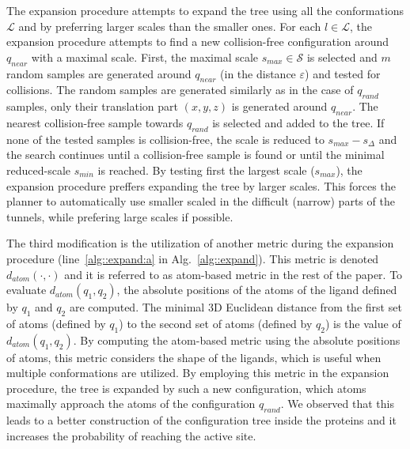\documentclass[usletter, 10pt, conference]{ieeeconf} %
\def\qrand{q_{rand}}
\def\qnear{q_{near}}
\def\da{d_{atom}}
\def\smin{s_{min}}
\def\smax{s_{max}}
\def\sdelta{s_{\Delta}}
\def\L{\mathcal{L}}
\def\S{\mathcal{S}}
\begin{document}
The expansion procedure attempts to expand the tree using all the conformations $\L$ and by preferring larger scales than the smaller ones.
For each $l \in \L$, the expansion procedure attempts to find a new collision-free configuration around $\qnear$ with a maximal scale.
First, the maximal scale $\smax \in \S$ is selected and $m$ random samples are generated around $\qnear$ (in the distance $\varepsilon$) 
and tested for collisions.
The random samples are generated similarly as in the case of $\qrand$ samples, only their translation
part $(x,y,z)$ is generated around $\qnear$.
The nearest collision-free sample towards $\qrand$ is selected and added to the tree.
If none of the tested samples is collision-free, the scale is reduced to $\smax-\sdelta$ and the search continues
until a collision-free sample is found or until the minimal reduced-scale $\smin$ is reached.
By testing first the largest scale ($\smax$), the expansion procedure preffers expanding the tree by larger scales.
This forces the planner to automatically use smaller scaled in the difficult (narrow) parts of the tunnels, while prefering
large scales if possible.

The third modification is the utilization of another metric during the expansion procedure (line~\ref{alg::expand:a} in Alg.~\ref{alg::expand}).
This metric is denoted $\da(\cdot,\cdot)$ and it is referred to as atom-based metric in the rest of the paper.
To evaluate $\da(q_1,q_2)$, the absolute positions of the atoms of the ligand defined by $q_1$ and $q_2$ are computed.
The minimal 3D Euclidean distance from the first set of atoms (defined by $q_1$) to the second set of atoms (defined by $q_2$) is the value of 
$\da(q_1,q_2)$.
By computing the atom-based metric using the absolute positions of atoms, this metric considers the shape of the ligands, which
is useful when multiple conformations are utilized.
By employing this metric in the expansion procedure, the tree is expanded by such a new configuration, which atoms maximally approach
the atoms of the configuration $\qrand$.
We observed that this leads to a better construction of the configuration tree inside the proteins and it increases the probability
of reaching the active site.

\end{document}

